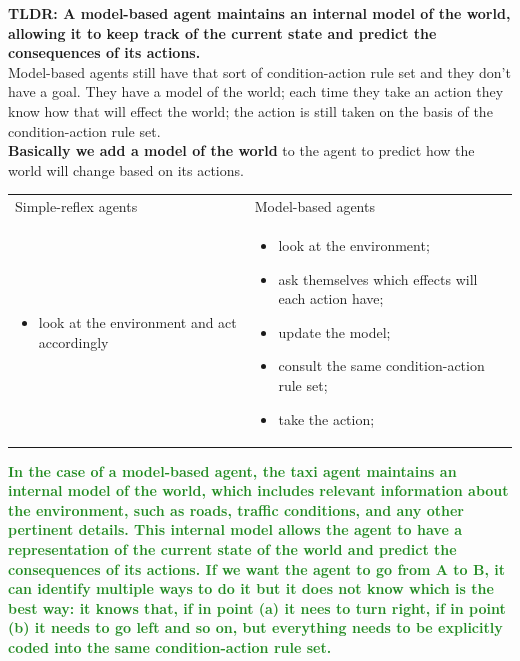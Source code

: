 \documentclass{article}
\begin{document}
\textbf{TLDR: A model-based agent maintains an internal model of the world, allowing it to keep track of the current state and predict the consequences of its actions.} \\

Model-based agents still have that sort of condition-action rule set and they don't have a goal. They have a model of the world; each time they take an action they know how that will effect the world; the action is still taken on the basis of the condition-action rule set. \\

\textbf{Basically we add a model of the world} to the agent to predict how the world will change based on its actions.

\begin{center}
    \begin{tabular}{p{}|p{}}
    
        Simple-reflex agents & Model-based agents \\
        
        \begin{itemize}
            \item look at the environment and act accordingly
        \end{itemize} & 
        \begin{itemize}
            \item look at the environment;
            \item ask themselves which effects will each action have;
            \item update the model;
            \item consult the same condition-action rule set;
            \item take the action;
        \end{itemize} 
    \end{tabular}
\end{center}

\newpage

\textcolor{ForestGreen}{\textbf{
    In the case of a model-based agent, the taxi agent maintains an internal model of the world, which includes relevant information about the environment, such as roads, traffic conditions, and any other pertinent details. This internal model allows the agent to have a representation of the current state of the world and predict the consequences of its actions.
    If we want the agent to go from A to B, it can identify multiple ways to do it but it does not know which is the best way: it knows that, if in point (a) it nees to turn right, if in point (b) it needs to go left and so on, but everything needs to be explicitly coded into the same condition-action rule set.
}}
\end{document}
